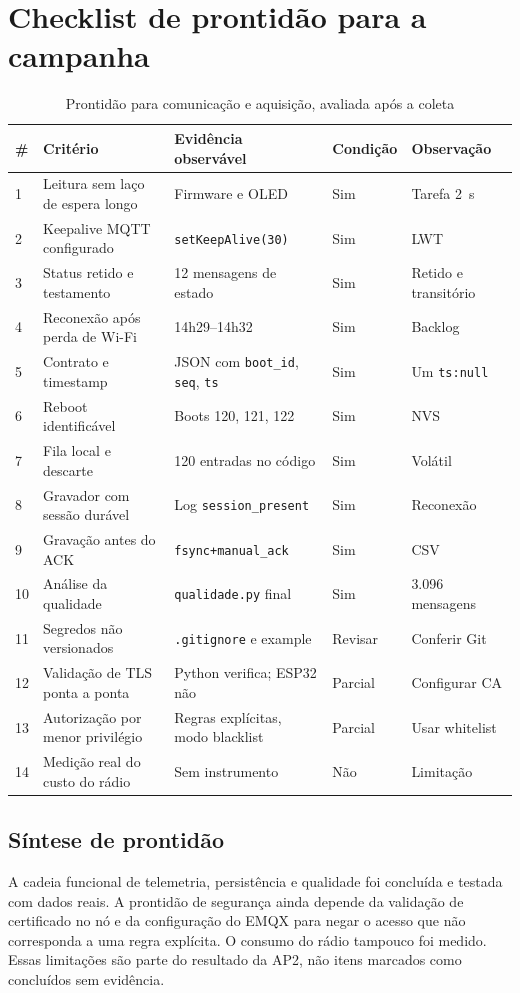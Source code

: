\chapter{Checklist de prontidão para a campanha}\label{ap:checklist}
\begin{table}[H]\centering\caption{Prontidão para comunicação e aquisição, avaliada após a coleta}\label{tab:checklist}\scriptsize
\begin{tabular}{@{}C{.55cm}L{4.65cm}L{4.4cm}L{1.5cm}L{2.7cm}@{}}\toprule
\#&Critério&Evidência observável&Condição&Observação\\&Leitura sem laço de espera longo&Firmware e OLED&Sim&Tarefa 2~s\\
2&Keepalive MQTT configurado&\texttt{setKeepAlive(30)}&Sim&LWT\\
3&Status retido e testamento&12 mensagens de estado&Sim&Retido e transitório\\
4&Reconexão após perda de Wi-Fi&14h29--14h32&Sim&Backlog\\
5&Contrato e timestamp&JSON com \texttt{boot\_id}, \texttt{seq}, \texttt{ts}&Sim&Um \texttt{ts:null}\\
6&Reboot identificável&Boots 120, 121, 122&Sim&NVS\\
7&Fila local e descarte&120 entradas no código&Sim&Volátil\\
8&Gravador com sessão durável&Log \texttt{session\_present}&Sim&Reconexão\\
9&Gravação antes do ACK&\texttt{fsync+manual\_ack}&Sim&CSV\\
10&Análise da qualidade&\texttt{qualidade.py} final&Sim&3.096 mensagens\\
11&Segredos não versionados&\texttt{.gitignore} e example&Revisar&Conferir Git\\
12&Validação de TLS ponta a ponta&Python verifica; ESP32 não&Parcial&Configurar CA\\
13&Autorização por menor privilégio&Regras explícitas, modo blacklist&Parcial&Usar whitelist\\
14&Medição real do custo do rádio&Sem instrumento&Não&Limitação\\\bottomrule\end{tabular}\end{table}
\section*{Síntese de prontidão}
A cadeia funcional de telemetria, persistência e qualidade foi concluída e testada com dados reais. A prontidão de segurança ainda depende da validação de certificado no nó e da configuração do EMQX para negar o acesso que não corresponda a uma regra explícita. O consumo do rádio tampouco foi medido. Essas limitações são parte do resultado da AP2, não itens marcados como concluídos sem evidência.
